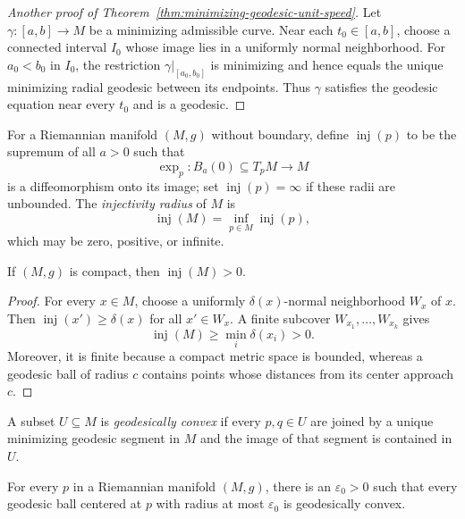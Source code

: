 \begin{proof}[Another proof of Theorem~\ref{thm:minimizing-geodesic-unit-speed}]
\sketch Let $\gamma\colon[a,b]\to M$ be a minimizing admissible curve. Near
each $t_0\in[a,b]$, choose a connected interval $I_0$ whose image lies in a
uniformly normal neighborhood. For $a_0<b_0$ in $I_0$, the restriction
$\gamma|_{[a_0,b_0]}$ is minimizing and hence equals the unique minimizing
radial geodesic between its endpoints. Thus $\gamma$ satisfies the geodesic
equation near every $t_0$ and is a geodesic.
\end{proof}

For a Riemannian manifold $(M,g)$ without boundary, define
$\operatorname{inj}(p)$ to be the supremum of all $a>0$ such that
\[
\exp_p\colon B_a(0)\subseteq T_pM\longrightarrow M
\]
is a diffeomorphism onto its image; set $\operatorname{inj}(p)=\infty$ if
these radii are unbounded. The \emph{injectivity radius} of $M$ is
\[
\operatorname{inj}(M)=\inf_{p\in M}\operatorname{inj}(p),
\]
which may be zero, positive, or infinite.

\begin{lemma}
\label{lem:compact-injectivity-radius-positive}

If $(M,g)$ is compact, then $\operatorname{inj}(M)>0$.
\end{lemma}

\begin{proof}
\sketch For every $x\in M$, choose a uniformly $\delta(x)$-normal
neighborhood $W_x$ of $x$. Then
$\operatorname{inj}(x')\geq\delta(x)$ for all $x'\in W_x$. A finite subcover
$W_{x_1},\ldots,W_{x_k}$ gives
\[
\operatorname{inj}(M)\geq\min_i\delta(x_i)>0.
\]
Moreover, it is finite because a compact metric space is bounded, whereas a
geodesic ball of radius $c$ contains points whose distances from its center
approach $c$.
\end{proof}

A subset $U\subseteq M$ is \emph{geodesically convex} if every $p,q\in U$ are
joined by a unique minimizing geodesic segment in $M$ and the image of that
segment is contained in $U$.

\begin{theorem}
\label{thm:small-geodesic-ball-convex}
For every $p$ in a Riemannian manifold $(M,g)$, there is an
$\varepsilon_0>0$ such that every geodesic ball centered at $p$ with radius at
most $\varepsilon_0$ is geodesically convex.
\end{theorem}

